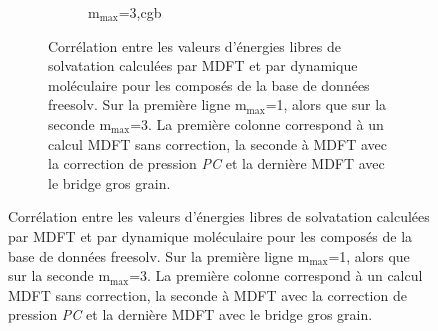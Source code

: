 \begin{figure}
\begin{figure}[H]
\begin{subfigure}[b]{0.30\textwidth}
{          }
       \label{fig:correlation_avec_sans_cgb:mmax3_pc}
    \end{subfigure}
   \begin{subfigure}[b]{0.30\textwidth}
       \centering
       \caption{$\mathrm{m}_\mathrm{max}$=3,cgb}
       \label{fig:correlation_avec_sans_cgb:mmax3_cgb}
    \end{subfigure}
    
    
  \caption[Corrélation entre les valeurs d'énergies libres de solvatation calculées par MDFT et par dynamique moléculaire pour les composés de la base de données freesolv.]{Corrélation entre les valeurs d'énergies libres de solvatation calculées par MDFT et par dynamique moléculaire pour les composés de la base de données freesolv. Sur la première ligne $\mathrm{m}_\mathrm{max}$=1, alors que sur la seconde $\mathrm{m}_\mathrm{max}$=3. La première colonne correspond à un calcul MDFT sans correction, la seconde à MDFT avec la correction de pression \textit{PC} et la dernière MDFT avec le bridge gros grain. }
  \label{fig:correlation_avec_sans_cgb}
\end{figure}
\end{figure}


